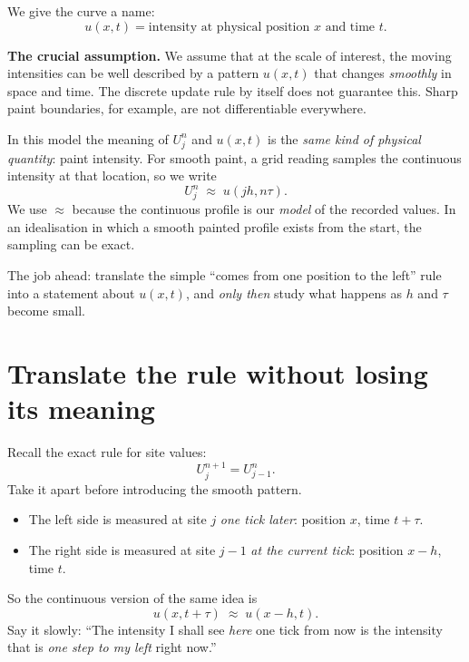 \documentclass[11pt,a4paper]{article}
\newcommand{\secstart}[1]{\Needspace{7\baselineskip}\section{#1}}
\begin{document}
We give the curve a name:
\[
\boxed{u(x,t)=\text{intensity at physical position }x\text{ and time }t.}
\]
\begin{center}
\end{center}
\textbf{The crucial assumption.} We assume that at the scale of interest, the moving intensities can be well described by a pattern $u(x,t)$ that changes \emph{smoothly} in space and time. The discrete update rule by itself does not guarantee this. Sharp paint boundaries, for example, are not differentiable everywhere.

In this model the meaning of $U_j^n$ and $u(x,t)$ is the \emph{same kind of physical quantity}: paint intensity. For smooth paint, a grid reading samples the continuous intensity at that location, so we write
\[
U_j^n\;\approx\;u(jh,n\tau).
\]
We use $\approx$ because the continuous profile is our \emph{model} of the recorded values. In an idealisation in which a smooth painted profile exists from the start, the sampling can be exact.

\begin{pointbox}
The job ahead: translate the simple ``comes from one position to the left'' rule into a statement about $u(x,t)$, and \emph{only then} study what happens as $h$ and $\tau$ become small.
\end{pointbox}

\clearpage
\secstart{Translate the rule without losing its meaning}
Recall the exact rule for site values:
\[
U_j^{n+1}=U_{j-1}^{n}.
\]
Take it apart before introducing the smooth pattern.
\begin{itemize}
\item The left side is measured at site $j$ \emph{one tick later}: position $x$, time $t+\tau$.
\item The right side is measured at site $j-1$ \emph{at the current tick}: position $x-h$, time $t$.
\end{itemize}
So the continuous version of the same idea is
\begin{equation}
\boxed{u(x,t+\tau)\;\approx\;u(x-h,t).}\tag{3}
\end{equation}
Say it slowly: ``The intensity I shall see \emph{here} one tick from now is the intensity that is \emph{one step to my left} right now.''
\end{document}
